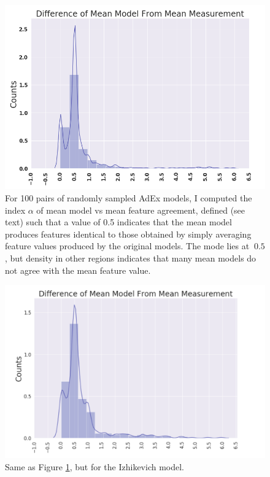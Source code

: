 \begin{figure}
    \centering
    \includegraphics{figures/mean_model_vs_mean_measurement.png}
    \caption[Mean Model vs Mean Features for AdEx]{For 100 pairs of randomly sampled AdEx models, I computed the index $\alpha$ of mean model vs mean feature agreement, defined (see text) such that a value of 0.5 indicates that the mean model produces features identical to those obtained by simply averaging feature values produced by the original models.
    The mode lies at $~0.5$, but density in other regions indicates that many mean models do not agree with the mean feature value.}
    \label{fig:mean-model-1}
\end{figure}

\begin{figure}
    \centering
    \includegraphics{figures/reproduced_izhi.png}
    \caption[Mean Model vs Mean Features for Izhikevich]{Same as Figure \ref{fig:mean-model-1}, but for the Izhikevich model.}
    \label{fig:mean-model-2}
\end{figure}

